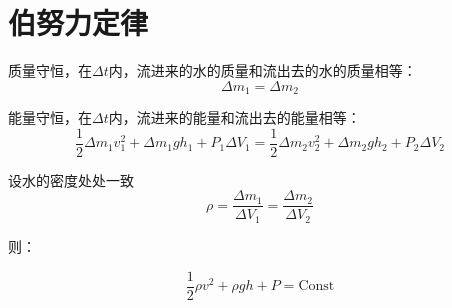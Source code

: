 
\section{伯努力定律}%

质量守恒，在\( \Delta t \)内，流进来的水的质量和流出去的水的质量相等：
\begin{equation*}
	\Delta m_1 = \Delta m_2
\end{equation*}

能量守恒，在\( \Delta t \)内，流进来的能量和流出去的能量相等：
\begin{equation*}
	\frac{1}{2}
	\Delta m_1 v_1^2 + \Delta m_1 g h_1 + P_1 \Delta V_1
	=
	\frac{1}{2}
	\Delta m_2 v_2^2 + \Delta m_2 g h_2 + P_2 \Delta V_2
\end{equation*}

设水的密度处处一致
\begin{equation*}
	\rho = 
	\frac{\Delta m_1}{\Delta V_1}
	=
	\frac{\Delta m_2}{\Delta V_2}
\end{equation*}


则：

\begin{equation*}
	\frac{1}{2} \rho v^2 + \rho g h + P = \text{Const}
\end{equation*}




